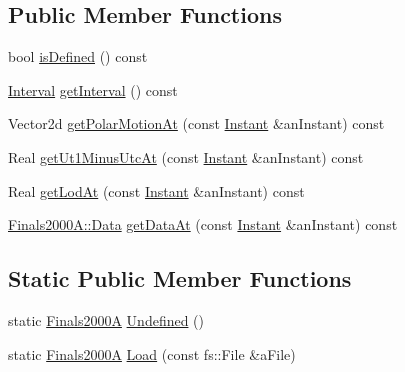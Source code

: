 \subsection*{Public Member Functions}
\begin{DoxyCompactItemize}
\item 
bool \hyperlink{classlibrary_1_1physics_1_1coord_1_1frame_1_1provider_1_1iers_1_1_finals2000_a_af87374c2ad6f1f81aad5abfe1b3b90f9}{is\+Defined} () const
\item 
\hyperlink{classlibrary_1_1physics_1_1time_1_1_interval}{Interval} \hyperlink{classlibrary_1_1physics_1_1coord_1_1frame_1_1provider_1_1iers_1_1_finals2000_a_a327ff24883eb53123cc24138e9269c48}{get\+Interval} () const
\item 
Vector2d \hyperlink{classlibrary_1_1physics_1_1coord_1_1frame_1_1provider_1_1iers_1_1_finals2000_a_a9bb453db22a0196f015f346c986d89dd}{get\+Polar\+Motion\+At} (const \hyperlink{classlibrary_1_1physics_1_1time_1_1_instant}{Instant} \&an\+Instant) const
\item 
Real \hyperlink{classlibrary_1_1physics_1_1coord_1_1frame_1_1provider_1_1iers_1_1_finals2000_a_aa76c7ba7198ef2bd5f9b9feb8adb5ee8}{get\+Ut1\+Minus\+Utc\+At} (const \hyperlink{classlibrary_1_1physics_1_1time_1_1_instant}{Instant} \&an\+Instant) const
\item 
Real \hyperlink{classlibrary_1_1physics_1_1coord_1_1frame_1_1provider_1_1iers_1_1_finals2000_a_a8ea6986b80b0777ec7b11a9a0ee60d70}{get\+Lod\+At} (const \hyperlink{classlibrary_1_1physics_1_1time_1_1_instant}{Instant} \&an\+Instant) const
\item 
\hyperlink{structlibrary_1_1physics_1_1coord_1_1frame_1_1provider_1_1iers_1_1_finals2000_a_1_1_data}{Finals2000\+A\+::\+Data} \hyperlink{classlibrary_1_1physics_1_1coord_1_1frame_1_1provider_1_1iers_1_1_finals2000_a_a5e7b1a165152fd3ccf0bbfdc859dd3f5}{get\+Data\+At} (const \hyperlink{classlibrary_1_1physics_1_1time_1_1_instant}{Instant} \&an\+Instant) const
\end{DoxyCompactItemize}
\subsection*{Static Public Member Functions}
\begin{DoxyCompactItemize}
\item 
static \hyperlink{classlibrary_1_1physics_1_1coord_1_1frame_1_1provider_1_1iers_1_1_finals2000_a}{Finals2000A} \hyperlink{classlibrary_1_1physics_1_1coord_1_1frame_1_1provider_1_1iers_1_1_finals2000_a_ab860c78d5315d96fdd2e53e5f6a3efd1}{Undefined} ()
\item 
static \hyperlink{classlibrary_1_1physics_1_1coord_1_1frame_1_1provider_1_1iers_1_1_finals2000_a}{Finals2000A} \hyperlink{classlibrary_1_1physics_1_1coord_1_1frame_1_1provider_1_1iers_1_1_finals2000_a_a280812cd766e12620b7dc15254c92779}{Load} (const fs\+::\+File \&a\+File)
\end{DoxyCompactItemize}
